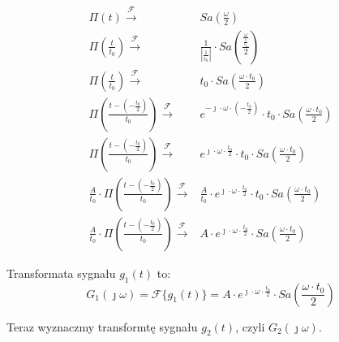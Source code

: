 \begin{task}
\begin{align*}
\Pi(t) \xrightarrow{\mathcal F} & Sa\left(\frac{\omega}{2}\right)\\
\Pi(\frac{t}{t_{0}}) \xrightarrow{\mathcal F} & \frac{1}{\left|\frac{1}{t_{0}}\right|} \cdot Sa\left(\frac{ \frac{\omega}{ \frac{1}{t_{0}} }}{2}\right)\\
\Pi(\frac{t}{t_{0}}) \xrightarrow{\mathcal F} & t_{0} \cdot Sa\left(\frac{\omega \cdot t_{0}}{2}\right)\\
\Pi(\frac{t-(-\frac{t_{0}}{2})}{t_{0}}) \xrightarrow{\mathcal F} & e^{-\jmath \cdot \omega \cdot (-\frac{t_{0}}{2})} \cdot t_{0} \cdot Sa\left(\frac{\omega \cdot t_{0}}{2}\right)\\
\Pi(\frac{t-(-\frac{t_{0}}{2})}{t_{0}}) \xrightarrow{\mathcal F} & e^{\jmath \cdot \omega \cdot \frac{t_{0}}{2}} \cdot t_{0} \cdot Sa\left(\frac{\omega \cdot t_{0}}{2}\right)\\
\frac{A}{t_{0}} \cdot \Pi(\frac{t-(-\frac{t_{0}}{2})}{t_{0}}) \xrightarrow{\mathcal F} & \frac{A}{t_{0}} \cdot e^{\jmath \cdot \omega \cdot \frac{t_{0}}{2}} \cdot t_{0} \cdot Sa\left(\frac{\omega \cdot t_{0}}{2}\right)\\
\frac{A}{t_{0}} \cdot \Pi(\frac{t-(-\frac{t_{0}}{2})}{t_{0}}) \xrightarrow{\mathcal F} & A \cdot e^{\jmath \cdot \omega \cdot \frac{t_{0}}{2}} \cdot Sa\left(\frac{\omega \cdot t_{0}}{2}\right)
\end{align*}

Transformata sygnału $g_{1}(t)$ to:
\begin{equation}
G_{1}(\jmath \omega) = \mathcal F\{g_{1}(t)\} = A \cdot e^{\jmath \cdot \omega \cdot \frac{t_{0}}{2}} \cdot Sa\left(\frac{\omega \cdot t_{0}}{2}\right)
\end{equation}

Teraz wyznaczmy transformtę sygnału $g_{2}(t)$, czyli $G_{2}(\jmath \omega)$.


\end{task}
